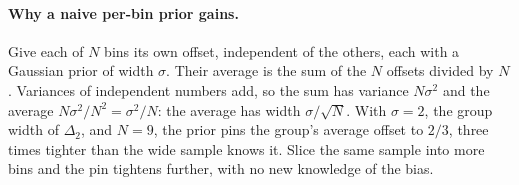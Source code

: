 \documentclass[11pt]{article}
\newcommand{\wDtwo}{2}
\newcommand{\ToyN}{9}
\newcommand{\ToyAvg}{2/3}
\newcommand{\ToyFactor}{three}
\begin{document}
\paragraph{Why a naive per-bin prior gains.}
Give each of $N$ bins its own offset, independent of the others, each
with a Gaussian prior of width $\sigma$.  Their average is the sum of
the $N$ offsets divided by $N$.  Variances of independent numbers add,
so the sum has variance $N\sigma^2$ and the average
$N\sigma^2/N^2 = \sigma^2/N$: the average has width $\sigma/\sqrt{N}$.
With $\sigma = \wDtwo$, the group width of $\Delta_2$, and
$N = \ToyN$, the prior pins the group's average offset to $\ToyAvg$,
\ToyFactor{} times tighter than the wide sample knows it.  Slice the same sample into more bins and the
pin tightens further, with no new knowledge of the bias.
\end{document}

